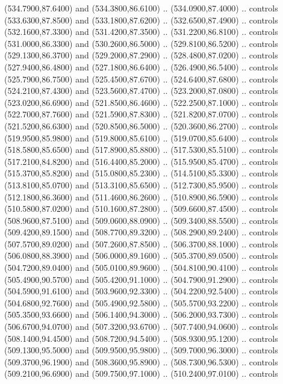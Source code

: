 {\begin{scope}[y=0.80pt, x=0.80pt, yscale=-1, xscale=1, inner sep=0pt, outer sep=0pt, #1]
      (534.7900,87.6400) and (534.3800,86.6100) .. (534.0900,87.4000) .. controls
      (533.6300,87.8500) and (533.1800,87.6200) .. (532.6500,87.4900) .. controls
      (532.1600,87.3300) and (531.4200,87.3500) .. (531.2200,86.8100) .. controls
      (531.0000,86.3300) and (530.2600,86.5000) .. (529.8100,86.5200) .. controls
      (529.1300,86.3700) and (529.2000,87.2900) .. (528.4800,87.0200) .. controls
      (527.9400,86.4800) and (527.1800,86.6400) .. (526.4900,86.5400) .. controls
      (525.7900,86.7500) and (525.4500,87.6700) .. (524.6400,87.6800) .. controls
      (524.2100,87.4300) and (523.5600,87.4700) .. (523.2000,87.0800) .. controls
      (523.0200,86.6900) and (521.8500,86.4600) .. (522.2500,87.1000) .. controls
      (522.7000,87.7600) and (521.5900,87.8300) .. (521.8200,87.0700) .. controls
      (521.5200,86.6300) and (520.8500,86.5000) .. (520.3600,86.2700) .. controls
      (519.9500,85.9800) and (519.8000,85.6100) .. (519.0700,85.6400) .. controls
      (518.5800,85.6500) and (517.8900,85.8800) .. (517.5300,85.5100) .. controls
      (517.2100,84.8200) and (516.4400,85.2000) .. (515.9500,85.4700) .. controls
      (515.3700,85.8200) and (515.0800,85.2300) .. (514.5100,85.3300) .. controls
      (513.8100,85.0700) and (513.3100,85.6500) .. (512.7300,85.9500) .. controls
      (512.1800,86.3600) and (511.4600,86.2600) .. (510.8900,86.5900) .. controls
      (510.5800,87.0200) and (510.1600,87.2800) .. (509.6600,87.4500) .. controls
      (508.9600,87.5100) and (509.0600,88.0900) .. (509.3400,88.5500) .. controls
      (509.4200,89.1500) and (508.7700,89.3200) .. (508.2900,89.2400) .. controls
      (507.5700,89.0200) and (507.2600,87.8500) .. (506.3700,88.1000) .. controls
      (506.0800,88.3900) and (506.0000,89.1600) .. (505.3700,89.0500) .. controls
      (504.7200,89.0400) and (505.0100,89.9600) .. (504.8100,90.4100) .. controls
      (505.4900,90.5700) and (505.4200,91.1000) .. (504.7900,91.2900) .. controls
      (504.5900,91.6100) and (503.9600,92.3300) .. (504.2200,92.5400) .. controls
      (504.6800,92.7600) and (505.4900,92.5800) .. (505.5700,93.2200) .. controls
      (505.3500,93.6600) and (506.1400,94.3000) .. (506.2000,93.7300) .. controls
      (506.6700,94.0700) and (507.3200,93.6700) .. (507.7400,94.0600) .. controls
      (508.1400,94.4500) and (508.7200,94.5400) .. (508.9300,95.1200) .. controls
      (509.1300,95.5000) and (509.9500,95.9800) .. (509.7000,96.3000) .. controls
      (509.3700,96.1900) and (508.3600,95.8900) .. (508.7300,96.5300) .. controls
      (509.2100,96.6900) and (509.7500,97.1000) .. (510.2400,97.0100) .. controls

\end{scope}}
